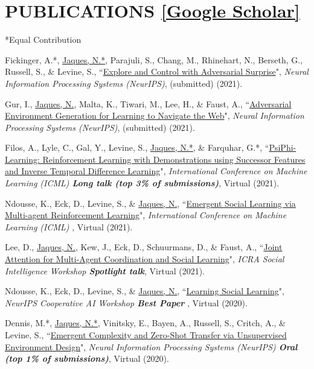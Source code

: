 \documentclass[paper=letter,fontsize=11pt]{scrartcl} %
\newcommand{\NewPart}[2]{\section*{\uppercase{#1} #2}}
\newcommand{\PaperEntry}[6]{
		\noindent #1, ``\href{#6}{#2}", \textit{#3}, #4 (#5).}
\begin{document}
\NewPart{Publications}{\href{https://scholar.google.co.uk/citations?user=8iCb2TwAAAAJ&hl=en}{[Google Scholar]}}
*Equal Contribution
\begin{etaremune}

\item \PaperEntry{Fickinger, A.*, \underline{Jaques, N.*}, Parajuli, S., Chang, M., Rhinehart, N., Berseth, G., Russell, S., \& Levine, S.}{Explore and Control with Adversarial Surprise}{Neural Information Processing Systems (NeurIPS)}{(submitted)}{2021}{}

\item \PaperEntry{Gur, I., \underline{Jaques, N.}, Malta, K., Tiwari, M., Lee, H., \& Faust, A.}{Adversarial Environment Generation for Learning to Navigate the Web}{Neural Information Processing Systems (NeurIPS)}{(submitted)}{2021}{https://arxiv.org/abs/2103.019917}

\item \PaperEntry{Filos, A., Lyle, C., Gal, Y., Levine, S., \underline{Jaques, N.*}, \& Farquhar, G.*}{PsiPhi-Learning: Reinforcement Learning with Demonstrations using Successor Features and Inverse Temporal Difference Learning}{International Conference on Machine Learning (ICML) \textbf{Long talk (top 3\% of submissions)}}{Virtual}{2021}{https://arxiv.org/pdf/2102.12560.pdf}

\item \PaperEntry{Ndousse, K., Eck, D., Levine, S., \& \underline{Jaques, N.}}{Emergent Social Learning via Multi-agent Reinforcement Learning}{International Conference on Machine Learning (ICML) }{Virtual}{2021}{https://arxiv.org/abs/2010.00581}

\item \PaperEntry{Lee, D., \underline{Jaques, N.}, Kew, J., Eck, D., Schuurmans, D., \& Faust, A.}{Joint Attention for Multi-Agent Coordination and Social Learning}{ICRA Social Intelligence Workshop \textbf{Spotlight talk}}{Virtual}{2021}{https://arxiv.org/abs/2104.07750}

\item \PaperEntry{Ndousse, K., Eck, D., Levine, S., \& \underline{Jaques, N.}}{Learning Social Learning}{NeurIPS Cooperative AI Workshop \textbf{Best Paper} }{Virtual}{2020}{https://arxiv.org/abs/2010.00581}

\item \PaperEntry{Dennis, M.*, \underline{Jaques, N.*}, Vinitsky, E., Bayen, A., Russell, S., Critch, A., \& Levine, S.}{Emergent Complexity and Zero-Shot Transfer via Unsupervised Environment Design}{Neural Information Processing Systems (NeurIPS) \textbf{Oral (top 1\% of submissions)}}{Virtual}{2020}{https://arxiv.org/abs/2012.02096}


\end{etaremune}
\end{document}
